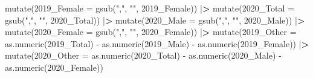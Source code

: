 \documentclass[
]{article}
\newenvironment{Shaded}{\begin{snugshade}}{\end{snugshade}}
\newcommand{\AttributeTok}[1]{\textcolor[rgb]{0.77,0.63,0.00}{#1}}
\newcommand{\ErrorTok}[1]{\textcolor[rgb]{0.64,0.00,0.00}{\textbf{#1}}}
\newcommand{\FunctionTok}[1]{\textcolor[rgb]{0.00,0.00,0.00}{#1}}
\newcommand{\NormalTok}[1]{#1}
\newcommand{\OtherTok}[1]{\textcolor[rgb]{0.56,0.35,0.01}{#1}}
\newcommand{\SpecialCharTok}[1]{\textcolor[rgb]{0.00,0.00,0.00}{#1}}
\newcommand{\StringTok}[1]{\textcolor[rgb]{0.31,0.60,0.02}{#1}}
\begin{document}
\begin{Shaded}
\begin{Highlighting}[]
  \FunctionTok{mutate}\NormalTok{(}\StringTok{\textasciigrave{}}\AttributeTok{2019\_Female}\StringTok{\textasciigrave{}} \OtherTok{=} \FunctionTok{gsub}\NormalTok{(}\StringTok{","}\NormalTok{, }\StringTok{""}\NormalTok{, }\StringTok{\textasciigrave{}}\AttributeTok{2019\_Female}\StringTok{\textasciigrave{}}\NormalTok{)) }\SpecialCharTok{|}\ErrorTok{\textgreater{}}
  \FunctionTok{mutate}\NormalTok{(}\StringTok{\textasciigrave{}}\AttributeTok{2020\_Total}\StringTok{\textasciigrave{}} \OtherTok{=} \FunctionTok{gsub}\NormalTok{(}\StringTok{","}\NormalTok{, }\StringTok{""}\NormalTok{, }\StringTok{\textasciigrave{}}\AttributeTok{2020\_Total}\StringTok{\textasciigrave{}}\NormalTok{)) }\SpecialCharTok{|}\ErrorTok{\textgreater{}}
  \FunctionTok{mutate}\NormalTok{(}\StringTok{\textasciigrave{}}\AttributeTok{2020\_Male}\StringTok{\textasciigrave{}} \OtherTok{=} \FunctionTok{gsub}\NormalTok{(}\StringTok{","}\NormalTok{, }\StringTok{""}\NormalTok{, }\StringTok{\textasciigrave{}}\AttributeTok{2020\_Male}\StringTok{\textasciigrave{}}\NormalTok{)) }\SpecialCharTok{|}\ErrorTok{\textgreater{}}
  \FunctionTok{mutate}\NormalTok{(}\StringTok{\textasciigrave{}}\AttributeTok{2020\_Female}\StringTok{\textasciigrave{}} \OtherTok{=} \FunctionTok{gsub}\NormalTok{(}\StringTok{","}\NormalTok{, }\StringTok{""}\NormalTok{, }\StringTok{\textasciigrave{}}\AttributeTok{2020\_Female}\StringTok{\textasciigrave{}}\NormalTok{)) }\SpecialCharTok{|}\ErrorTok{\textgreater{}}
  \FunctionTok{mutate}\NormalTok{(}\StringTok{\textasciigrave{}}\AttributeTok{2019\_Other}\StringTok{\textasciigrave{}} \OtherTok{=} \FunctionTok{as.numeric}\NormalTok{(}\StringTok{\textasciigrave{}}\AttributeTok{2019\_Total}\StringTok{\textasciigrave{}}\NormalTok{) }\SpecialCharTok{{-}} \FunctionTok{as.numeric}\NormalTok{(}\StringTok{\textasciigrave{}}\AttributeTok{2019\_Male}\StringTok{\textasciigrave{}}\NormalTok{) }\SpecialCharTok{{-}} \FunctionTok{as.numeric}\NormalTok{(}\StringTok{\textasciigrave{}}\AttributeTok{2019\_Female}\StringTok{\textasciigrave{}}\NormalTok{)) }\SpecialCharTok{|}\ErrorTok{\textgreater{}} 
  \FunctionTok{mutate}\NormalTok{(}\StringTok{\textasciigrave{}}\AttributeTok{2020\_Other}\StringTok{\textasciigrave{}} \OtherTok{=} \FunctionTok{as.numeric}\NormalTok{(}\StringTok{\textasciigrave{}}\AttributeTok{2020\_Total}\StringTok{\textasciigrave{}}\NormalTok{) }\SpecialCharTok{{-}} \FunctionTok{as.numeric}\NormalTok{(}\StringTok{\textasciigrave{}}\AttributeTok{2020\_Male}\StringTok{\textasciigrave{}}\NormalTok{) }\SpecialCharTok{{-}} \FunctionTok{as.numeric}\NormalTok{(}\StringTok{\textasciigrave{}}\AttributeTok{2020\_Female}\StringTok{\textasciigrave{}}\NormalTok{))}
\end{Highlighting}
\end{Shaded}
\end{document}
